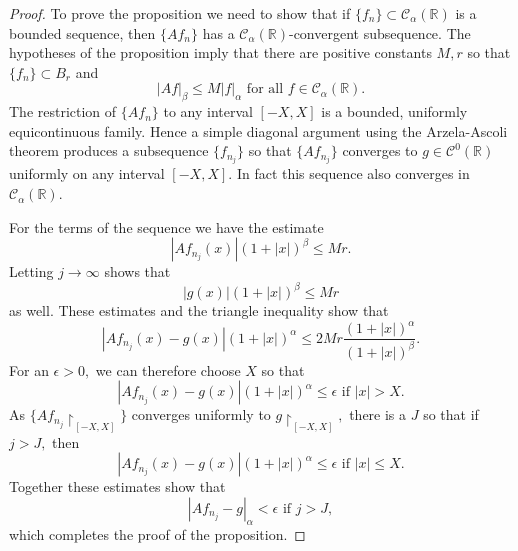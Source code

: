 \documentclass[11pt]{article}
\newcommand\cC{\mathcal{C}}
\newcommand\bbR{\mathbb R}
\newcommand\restrictedto{\upharpoonright}
\theoremstyle{definition}
\theoremstyle{remark}
\begin{document}
   \begin{proof}
     To prove the proposition we need to show that if $\{f_n\}\subset
     \cC_{\alpha}(\bbR)$ is a bounded sequence, then $\{Af_n\}$ has a
     $\cC_{\alpha}(\bbR)$-convergent subsequence. The hypotheses of the
     proposition imply that there are positive constants $M,r$ so that
     $\{f_n\}\subset B_r$ and 
     \begin{equation}
       |Af|_{\beta}\leq M|f|_{\alpha}\text{ for all }f\in\cC_{\alpha}(\bbR).
     \end{equation}
         The restriction of $\{Af_n\}$ to any interval $[-X,X]$ is a bounded,
         uniformly equicontinuous family. Hence a simple diagonal argument using
         the Arzela-Ascoli theorem produces a subsequence $\{f_{n_j}\}$ so that
         $\{Af_{n_j}\}$ converges to $g\in\cC^0(\bbR)$ uniformly on any interval
         $[-X,X].$ In fact this sequence also converges in $\cC_{\alpha}(\bbR).$

       For the terms of the sequence we have the estimate
       \begin{equation}
         |Af_{n_j}(x)|(1+|x|)^{\beta}\leq Mr.
       \end{equation}
       Letting $j\to\infty$ shows that
       \begin{equation}
         |g(x)|(1+|x|)^{\beta}\leq Mr
       \end{equation}
       as well. These estimates and the triangle inequality show that 
       \begin{equation}
         |Af_{n_j}(x)-g(x)|(1+|x|)^{\alpha}\leq 2Mr\frac{(1+|x|)^{\alpha}}{(1+|x|)^{\beta}}.
       \end{equation}
        For an $\epsilon>0,$ we can therefore choose $X$ so that
       \begin{equation}
           |Af_{n_j}(x)-g(x)|(1+|x|)^{\alpha}\leq \epsilon\text{ if }|x|>X.
       \end{equation}
       As $\{Af_{n_j}\restrictedto_{[-X,X]}\}$ converges uniformly to
       $g\restrictedto_{[-X,X]},$ there is a $J$ so that if $j>J,$ then
       \begin{equation}
         |Af_{n_j}(x)-g(x)|(1+|x|)^{\alpha}\leq \epsilon\text{ if }|x|\leq X.
       \end{equation}
       Together these estimates show that
       \begin{equation}
         |Af_{n_j}-g|_{\alpha}<\epsilon\text{ if }j>J,
       \end{equation}
       which completes the proof of the proposition.
   \end{proof}
  
\end{document}

